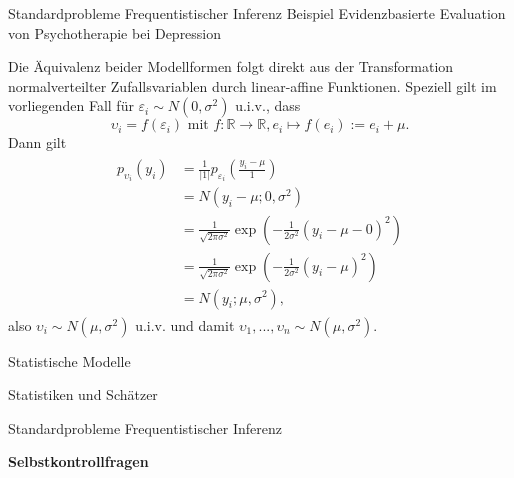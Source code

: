 \documentclass[
  8pt,
  ignorenonframetext,
]{beamer}
\newcommand{\ups}{\upsilon}
\begin{document}
\begin{frame}[t]{Standardprobleme Frequentistischer Inferenz}
\protect\hypertarget{standardprobleme-frequentistischer-inferenz-6}{}
Beispiel \textbar{} Evidenzbasierte Evaluation von Psychotherapie bei
Depression

\footnotesize

Die Äquivalenz beider Modellformen folgt direkt aus der Transformation
normalverteilter Zufallsvariablen durch linear-affine Funktionen.
Speziell gilt im vorliegenden Fall für
\(\varepsilon_i \sim N(0,\sigma^2)\) u.i.v., dass \begin{equation}
\ups_i = f(\varepsilon_i)
\mbox{ mit }
f : \mathbb{R} \to \mathbb{R}, e_i \mapsto f(e_i) := e_i + \mu.
\end{equation} Dann gilt \begin{align}
\begin{split}
p_{\ups_i}(y_i)
& = \frac{1}{|1|} p_{\varepsilon_i}\left(\frac{y_i - \mu}{1} \right)                        \\
& = N\left(y_i - \mu; 0, \sigma^2\right)                                                    \\
& = \frac{1}{\sqrt{2\pi\sigma^2}}\exp\left(-\frac{1}{2\sigma^2}(y_i - \mu - 0)^2 \right)    \\
& = \frac{1}{\sqrt{2\pi\sigma^2}}\exp\left(-\frac{1}{2\sigma^2}(y_i - \mu)^2 \right)        \\
& = N(y_i; \mu,\sigma^2),
\end{split}
\end{align} also \(\ups_i \sim N(\mu,\sigma^2)\) u.i.v. und damit
\(\ups_1,...,\ups_n \sim N(\mu,\sigma^2)\). \vfill
\end{frame}

\begin{frame}{}
\protect\hypertarget{section-8}{}
\large
{}
\vfill

Statistische Modelle

Statistiken und Schätzer

Standardprobleme Frequentistischer Inferenz

\textbf{Selbstkontrollfragen} \vfill
\end{frame}
\end{document}
